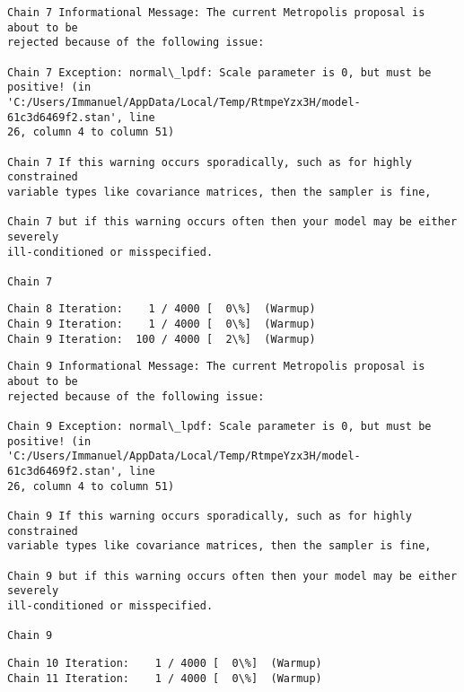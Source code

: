 \documentclass[11pt]{article}
\begin{document}
    \begin{Verbatim}[commandchars=\\\{\}]
Chain 7 Informational Message: The current Metropolis proposal is about to be
rejected because of the following issue:

Chain 7 Exception: normal\_lpdf: Scale parameter is 0, but must be positive! (in
'C:/Users/Immanuel/AppData/Local/Temp/RtmpeYzx3H/model-61c3d6469f2.stan', line
26, column 4 to column 51)

Chain 7 If this warning occurs sporadically, such as for highly constrained
variable types like covariance matrices, then the sampler is fine,

Chain 7 but if this warning occurs often then your model may be either severely
ill-conditioned or misspecified.

Chain 7

    \end{Verbatim}

    \begin{Verbatim}[commandchars=\\\{\}]
Chain 8 Iteration:    1 / 4000 [  0\%]  (Warmup)
Chain 9 Iteration:    1 / 4000 [  0\%]  (Warmup)
Chain 9 Iteration:  100 / 4000 [  2\%]  (Warmup)
    \end{Verbatim}

    \begin{Verbatim}[commandchars=\\\{\}]
Chain 9 Informational Message: The current Metropolis proposal is about to be
rejected because of the following issue:

Chain 9 Exception: normal\_lpdf: Scale parameter is 0, but must be positive! (in
'C:/Users/Immanuel/AppData/Local/Temp/RtmpeYzx3H/model-61c3d6469f2.stan', line
26, column 4 to column 51)

Chain 9 If this warning occurs sporadically, such as for highly constrained
variable types like covariance matrices, then the sampler is fine,

Chain 9 but if this warning occurs often then your model may be either severely
ill-conditioned or misspecified.

Chain 9

    \end{Verbatim}

    \begin{Verbatim}[commandchars=\\\{\}]
Chain 10 Iteration:    1 / 4000 [  0\%]  (Warmup)
Chain 11 Iteration:    1 / 4000 [  0\%]  (Warmup)
    \end{Verbatim}
\end{document}
